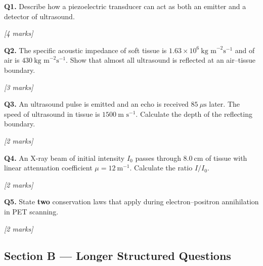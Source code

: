 \begin{tcolorbox}[colback=white, colframe=midblue, breakable]

\begin{minipage}{\linewidth}
\textbf{Q1.} Describe how a piezoelectric transducer can act as both an emitter and a detector of ultrasound.
\par\hfill\textit{[4 marks]}
\vspace{4.0cm}
\end{minipage}

\begin{minipage}{\linewidth}
\textbf{Q2.} The specific acoustic impedance of soft tissue is $1.63\times10^6\ \text{kg m}^{-2}\text{s}^{-1}$ and of air is $430\ \text{kg m}^{-2}\text{s}^{-1}$. Show that almost all ultrasound is reflected at an air--tissue boundary.
\par\hfill\textit{[3 marks]}
\vspace{3.5cm}
\end{minipage}

\begin{minipage}{\linewidth}
\textbf{Q3.} An ultrasound pulse is emitted and an echo is received $85\ \mu\text{s}$ later. The speed of ultrasound in tissue is $1500\ \text{m s}^{-1}$. Calculate the depth of the reflecting boundary.
\par\hfill\textit{[2 marks]}
\vspace{2.5cm}
\end{minipage}

\begin{minipage}{\linewidth}
\textbf{Q4.} An X-ray beam of initial intensity $I_0$ passes through $8.0\ \text{cm}$ of tissue with linear attenuation coefficient $\mu = 12\ \text{m}^{-1}$. Calculate the ratio $I/I_0$.
\par\hfill\textit{[2 marks]}
\vspace{2.5cm}
\end{minipage}

\begin{minipage}{\linewidth}
\textbf{Q5.} State \textbf{two} conservation laws that apply during electron--positron annihilation in PET scanning.
\par\hfill\textit{[2 marks]}
\vspace{2.0cm}
\end{minipage}

\end{tcolorbox}

\subsection*{Section B — Longer Structured Questions}

